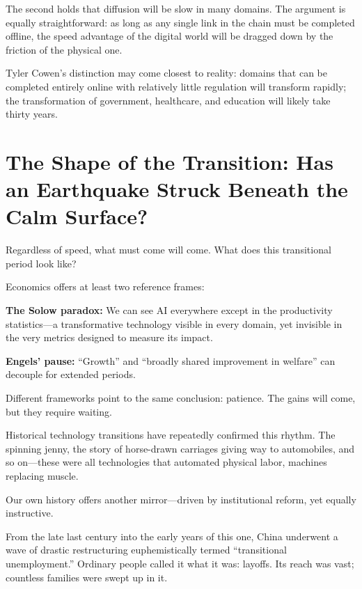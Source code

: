 \vspace{1em}

The second holds that diffusion will be slow in many domains. The argument is equally straightforward: as long as any single link in the chain must be completed offline, the speed advantage of the digital world will be dragged down by the friction of the physical one.

\vspace{1em}

Tyler Cowen's distinction may come closest to reality: domains that can be completed entirely online with relatively little regulation will transform rapidly; the transformation of government, healthcare, and education will likely take thirty years.

\newpage
\section{The Shape of the Transition: Has an Earthquake Struck Beneath the Calm Surface?}

Regardless of speed, what must come will come. What does this transitional period look like?

Economics offers at least two reference frames:

\textbf{The Solow paradox:} We can see AI everywhere except in the productivity statistics---a transformative technology visible in every domain, yet invisible in the very metrics designed to measure its impact.

\textbf{Engels' pause:} ``Growth'' and ``broadly shared improvement in welfare'' can decouple for extended periods.

Different frameworks point to the same conclusion: patience. The gains will come, but they require waiting.

\vspace{1em}

Historical technology transitions have repeatedly confirmed this rhythm. The spinning jenny, the story of horse-drawn carriages giving way to automobiles, and so on---these were all technologies that automated physical labor, machines replacing muscle.
\vspace{1em}

Our own history offers another mirror---driven by institutional reform, yet equally instructive.

From the late last century into the early years of this one, China underwent a wave of drastic restructuring euphemistically termed ``transitional unemployment.'' Ordinary people called it what it was: layoffs. Its reach was vast; countless families were swept up in it.

